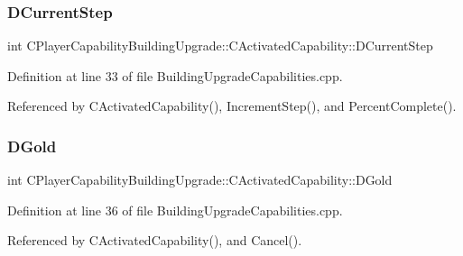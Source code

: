 \subsubsection{\texorpdfstring{D\+Current\+Step}{DCurrentStep}}
{\footnotesize\ttfamily int C\+Player\+Capability\+Building\+Upgrade\+::\+C\+Activated\+Capability\+::\+D\+Current\+Step\hspace{0.3cm}{\ttfamily [protected]}}



Definition at line 33 of file Building\+Upgrade\+Capabilities.\+cpp.



Referenced by C\+Activated\+Capability(), Increment\+Step(), and Percent\+Complete().

\hypertarget{classCPlayerCapabilityBuildingUpgrade_1_1CActivatedCapability_a86bea8030ade6995b4bb5b253fe9466c}{}\label{classCPlayerCapabilityBuildingUpgrade_1_1CActivatedCapability_a86bea8030ade6995b4bb5b253fe9466c} 
\subsubsection{\texorpdfstring{D\+Gold}{DGold}}
{\footnotesize\ttfamily int C\+Player\+Capability\+Building\+Upgrade\+::\+C\+Activated\+Capability\+::\+D\+Gold\hspace{0.3cm}{\ttfamily [protected]}}



Definition at line 36 of file Building\+Upgrade\+Capabilities.\+cpp.



Referenced by C\+Activated\+Capability(), and Cancel().

\hypertarget{classCPlayerCapabilityBuildingUpgrade_1_1CActivatedCapability_a497437c6eb755ccc9b18ff2a1e704c72}{}\label{classCPlayerCapabilityBuildingUpgrade_1_1CActivatedCapability_a497437c6eb755ccc9b18ff2a1e704c72} 
